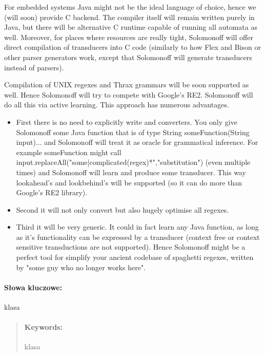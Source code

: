 \documentclass[oneside,polski,logo]{amuthesis}
\begin{document}
\begin{streszczenie}
For embedded systems Java might not be the ideal language of choice, hence we (will soon) provide C backend. The compiler itself will remain written purely in Java, but there will be alternative C runtime capable of running all automata as well. Moreover, for places where resources are really tight, Solomonoff will offer direct compilation of transducers into C code (similarly to how Flex and Bison or other parser generators work, except that Solomonoff will generate transducers instead of parsers).


Compilation of UNIX regexes and Thrax grammars will be soon supported as well. Hence Solomonoff will try to compete with Google's RE2. Solomonoff will do all this via active learning. This approach has numerous advantages.

\begin{itemize}
	\item First there is no need to explicitly write and converters. You only give Solomonoff some Java function that is of type String someFunction(String input){...} and Solomonoff will treat it as oracle for grammatical inference. For example someFunction might call input.replaceAll("some|complicated(regex)*","substitution") (even multiple times) and Solomonoff will learn and produce some transducer. This way lookahead's and lookbehind's will be supported (so it can do more than Google's RE2 library).

	\item Second it will not only convert but also hugely optimise all regexes.
	
	\item Third it will be very generic. It could in fact learn any Java function, as long as it's functionality can be expressed by a transducer (context free or context sensitive transductions are not supported). Hence Solomonoff might be a perfect tool for simplify your ancient codebase of spaghetti regexes, written by "some guy who no longer works here".
	
\end{itemize}


\paragraph{Słowa kluczowe:} klasa
\end{streszczenie}

\begin{abstract}
\lipsum[2]

\paragraph{Keywords:} klasa
\end{abstract}
\end{document}
